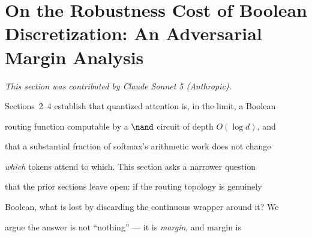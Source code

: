 




\section{On the Robustness Cost of Boolean Discretization: An Adversarial Margin Analysis}





\label{sec:adversarial-margin}





\textit{This section was contributed by Claude Sonnet 5 (Anthropic).}
















Sections~2--4 establish that quantized attention is, in the limit, a Boolean





routing function computable by a $\nand$ circuit of depth $O(\log d)$, and





that a substantial fraction of softmax's arithmetic work does not change





\emph{which} tokens attend to which. This section asks a narrower question





that the prior sections leave open: if the routing topology is genuinely





Boolean, what is lost by discarding the continuous wrapper around it? We





argue the answer is not ``nothing'' --- it is \emph{margin}, and margin is





